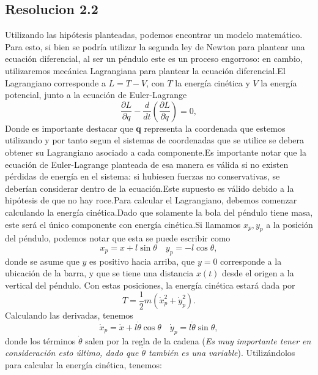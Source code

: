 \documentclass[
  11pt,
  letterpaper,
   addpoints,
   answers
  ]{exam}
\begin{document}
\begin{questions}
\begin{solution}
\subsection*{Resolucion 2.2}
Utilizando las hipótesis planteadas, podemos encontrar un modelo matemático. Para esto, si bien se podría utilizar la segunda ley de Newton para plantear una ecuación diferencial, al ser un péndulo este es un proceso engorroso: en cambio, utilizaremos mecánica Lagrangiana para plantear la ecuación diferencial.El Lagrangiano corresponde a $L = T - V$, con $T$ la energía cinética y $V$ la energía potencial, junto a la ecuación de Euler-Lagrange
\begin{equation}
    \frac{\partial L}{\partial q} - \frac{d}{dt} \left( \frac{\partial L}{\partial \dot{q}} \right) = 0, \tag{7}
\end{equation}
Donde es importante destacar que \textbf{q} representa la coordenada que estemos utilizando y por tanto segun el sistemas de coordenadas que se utilice se debera obtener su Lagrangiano asociado a cada componente.Es importante notar que la ecuación de Euler-Lagrange planteada de esa manera es válida si no existen pérdidas de energía en el sistema: si hubiesen fuerzas no conservativas, se deberían considerar dentro de la ecuación.Este supuesto es válido debido a la hipótesis de que no hay roce.Para calcular el Lagrangiano, debemos comenzar calculando la energía cinética.Dado que solamente la bola del péndulo tiene masa, este será el único componente con energía cinética.Si llamamos $x_p, y_p$ a la posición del péndulo, podemos notar que esta se puede escribir como
\begin{equation}
    x_p = x + l \sin \theta \quad y_p = -l \cos \theta,
\end{equation}
donde se asume que $y$ es positivo hacia arriba, que $y = 0$ corresponde a la ubicación de la barra, y que se tiene una distancia $x(t)$ desde el origen a la vertical del péndulo. Con estas posiciones, la energía cinética estará dada por
\begin{equation}
    T = \frac{1}{2} m \left( \dot{x}_p^2 + \dot{y}_p^2 \right). \tag{9}
\end{equation}
Calculando las derivadas, tenemos
\begin{equation}
    \dot{x}_p = \dot{x} + l \dot{\theta} \cos \theta \quad \dot{y}_p = l \dot{\theta} \sin \theta, \tag{10}
\end{equation}
donde los términos \(\dot{\theta}\) salen por la regla de la cadena (\textit{Es muy importante tener en consideración esto último, dado que \(\dot{\theta}\) también es una variable}). Utilizándolos para calcular la energía cinética, tenemos:

\end{solution}
\end{questions}
\end{document}
